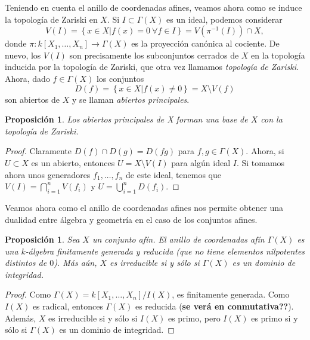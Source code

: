\documentclass[12pt,a4paper]{article}
\newtheorem{prop}[thm]{Proposición}
\theoremstyle{definition} \newtheorem{defn}[thm]{Definición}
\theoremstyle{definition} \newtheorem{ejemplo}[thm]{Ejemplo}
\theoremstyle{definition} \newtheorem{ejercicio}[thm]{Ejercicio}
\theoremstyle{remark} \newtheorem*{obs}{Observación}
\begin{document}
    Teniendo en cuenta el anillo de coordenadas afines, veamos ahora como se induce la topología de Zariski en $X$. Si $I\subset \Gamma(X)$ es un ideal, podemos considerar
    \begin{equation*}
      V(I)=\left\{ x\in X| f(x)=0 \ \forall f\in I \right\}=V(\pi^{-1}(I))\cap X,
    \end{equation*}
    donde $\pi:k[X_1,\dots,X_n]\rightarrow \Gamma(X)$ es la proyección canónica al cociente. De nuevo, los $V(I)$ son precisamente los subconjuntos cerrados de $X$ en la topología inducida por la topología de Zariski, que otra vez llamamos \emph{topología de Zariski}. Ahora, dado $f\in \Gamma(X)$ los conjuntos 
    \begin{equation*}
      D(f)=\left\{ x\in X|f(x)\neq 0 \right\}=X\setminus V(f)
    \end{equation*}
    son abiertos de $X$ y se llaman \emph{abiertos principales}.

    \begin{prop}
      Los abiertos principales de X forman una base de $X$ con la topología de Zariski.
    \end{prop}
    \begin{proof}
      Claramente $D(f)\cap D(g)=D(fg)$ para $f,g \in \Gamma(X)$. Ahora, si $U\subset X$ es un abierto, entonces $U=X\setminus V(I)$ para algún ideal $I$. Si tomamos ahora unos generadores $f_1,\dots,f_n$ de este ideal, tenemos que $V(I)=\bigcap_{i=1}^n V(f_i)$ y $U=\bigcup_{i=1}^n D(f_i)$.
    \end{proof}
    
    Veamos ahora como el anillo de coordenadas afines nos permite obtener una dualidad entre álgebra y geometría en el caso de los conjuntos afines. 
    \begin{prop}
      Sea $X$ un conjunto afín. El anillo de coordenadas afín $\Gamma(X)$ es una $k$-álgebra finitamente generada y reducida (que no tiene elementos nilpotentes distintos de $0$). Más aún, $X$ es irreducible si y sólo si $\Gamma(X)$ es un dominio de integridad.
    \end{prop}
    \begin{proof}
      Como $\Gamma(X)=k[X_1,\dots,X_n]/I(X)$, es finitamente generada. Como $I(X)$ es radical, entonces $\Gamma(X)$ es reducida (\textbf{se verá en conmutativa??}). Además, $X$ es irreducible si y sólo si $I(X)$ es primo, pero $I(X)$ es primo si y sólo si $\Gamma(X)$ es un dominio de integridad.
    \end{proof}
\end{document}

